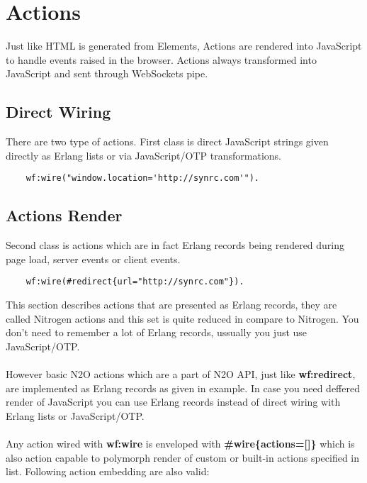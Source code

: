 \section{Actions}
Just like HTML is generated from Elements, Actions are rendered into
JavaScript to handle events raised in the browser. Actions always
transformed into JavaScript and sent through WebSockets pipe.

\subsection*{Direct Wiring}
There are two type of actions. First class is direct JavaScript
strings given directly as Erlang lists or via JavaScript/OTP
transformations.

\vspace{1\baselineskip}
\begin{lstlisting}
    wf:wire("window.location='http://synrc.com'").
\end{lstlisting}

\subsection*{Actions Render}
Second class is actions which are in fact Erlang records being
rendered during page load, server events or client events.

\vspace{1\baselineskip}
\begin{lstlisting}
    wf:wire(#redirect{url="http://synrc.com"}).
\end{lstlisting}
\vspace{1\baselineskip}

This section describes actions that are presented as Erlang records,
they are called Nitrogen actions and this set is quite reduced in compare to Nitrogen.
You don't need to remember a lot of Erlang records, ussually you just
use JavaScript/OTP.

\paragraph{}
However basic N2O actions which are a part of N2O API, just like {\bf wf:redirect},
are implemented as Erlang records as given in example. In case you need deffered
render of JavaScript you can use Erlang records instead of direct wiring with
Erlang lists or JavaScript/OTP.

\paragraph{}
Any action wired with {\bf wf:wire} is enveloped with {\bf \#wire\{actions=[]\}}
which is also action capable to polymorph render of custom or built-in actions specified in list.
Following action embedding are also valid:


